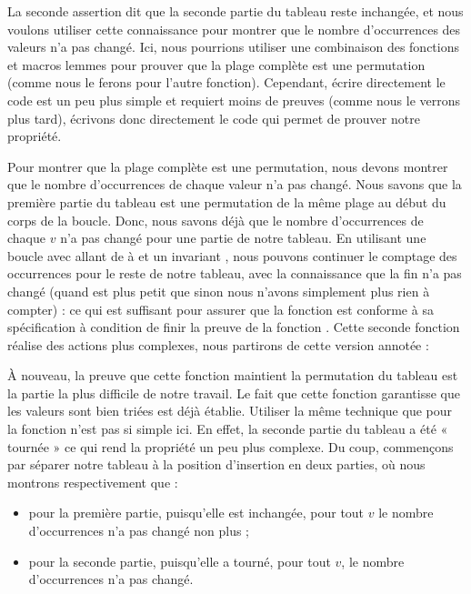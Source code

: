La seconde assertion dit que la seconde partie du tableau reste inchangée, et nous
voulons utiliser cette connaissance pour montrer que le nombre d'occurrences des
valeurs n'a pas changé. Ici, nous pourrions utiliser une combinaison des
fonctions et macros lemmes pour prouver que la plage complète est une
permutation (comme nous le ferons pour l'autre fonction). Cependant, écrire
directement le code est un peu plus simple et requiert moins de preuves (comme
nous le verrons plus tard), écrivons donc directement le code qui permet de
prouver notre propriété.


Pour montrer que la plage complète est une permutation, nous devons montrer que le
nombre d'occurrences de chaque valeur n'a pas changé. Nous savons que la première
partie du tableau est une permutation de la même plage au début du corps de la
boucle. Donc, nous savons déjà que le nombre d'occurrences de chaque $v$ n'a pas
changé pour une partie de notre tableau. En utilisant une boucle avec
 allant de  à  et un invariant
, nous pouvons continuer le comptage des
occurrences pour le reste de notre tableau, avec la connaissance que la fin n'a
pas changé (quand  est plus petit que  sinon
nous n'avons simplement plus rien à compter) :
ce qui est suffisant pour assurer que la fonction 
est conforme à sa spécification à condition de finir la preuve de la fonction
. Cette seconde fonction réalise des actions plus
complexes, nous partirons de cette version annotée :




À nouveau, la preuve que cette fonction maintient la permutation du tableau est
la partie la plus difficile de notre travail. Le fait que cette fonction
garantisse que les valeurs sont bien triées est déjà établie. Utiliser la
même technique que pour la fonction  n'est pas si
simple ici. En effet, la seconde partie du tableau a été « tournée » ce qui
rend la propriété un peu plus complexe. Du coup, commençons par séparer notre
tableau à la position d'insertion en deux parties, où nous montrons
respectivement que :
\begin{itemize}
    \item pour la première partie, puisqu'elle est inchangée, pour tout $v$
          le nombre d'occurrences n'a pas changé non plus ;
    \item pour la seconde partie, puisqu'elle a tourné, pour tout $v$, le
          nombre d'occurrences n'a pas changé.
\end{itemize}


